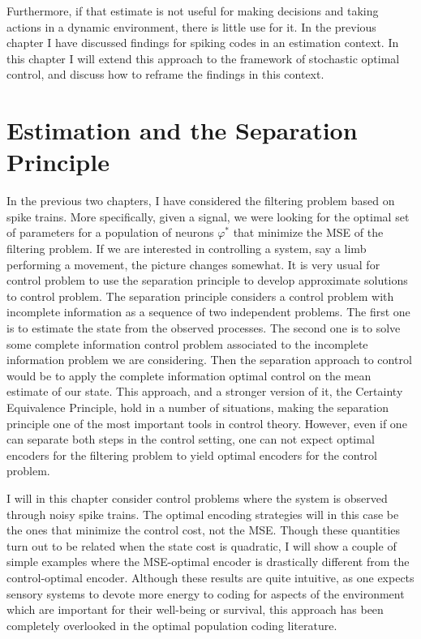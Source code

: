  Furthermore, if that estimate is not useful for making decisions and taking actions in a dynamic environment, there is little use for it. In the previous chapter I have discussed findings for spiking codes in an estimation context. In this chapter I will extend this approach to the framework of stochastic optimal control, and discuss how to reframe the findings in this context.\par

\section{Estimation and the Separation Principle}

In the previous two chapters, I have considered the filtering problem based on spike trains. More specifically, given a signal, we were looking for the optimal set of parameters for a population of neurons $\varphi^*$ that minimize the MSE of the filtering problem. If we are interested in controlling a system, say a limb performing a movement, the picture changes somewhat. It is very usual for control problem to use the separation principle\cite{Bar-Shalom1974} to develop approximate solutions to control problem. The separation principle considers a control problem with incomplete information as a sequence of two independent problems. The first one is to estimate the state from the observed processes. The second one is to solve some complete information control problem associated to the incomplete information problem we are considering. Then the separation approach to control would be to apply the complete information optimal control on the mean estimate of our state. This approach, and a stronger version of it, the Certainty Equivalence Principle, hold in a number of situations, making the separation principle one of the most important tools in control theory. However, even if one can separate both steps in the control setting, one can not expect optimal encoders for the filtering problem to yield optimal encoders for the control problem.\par
I will in this chapter consider control problems where the system is observed through noisy spike trains. The optimal encoding strategies will in this case be the ones that minimize the control cost, not the MSE. Though these quantities turn out to be related when the state cost is quadratic, I will show a couple of simple examples where the MSE-optimal encoder is drastically different from the control-optimal encoder. Although these results are quite intuitive, as one expects sensory systems to devote more energy to coding for aspects of the environment which are important for their well-being or survival, this approach has been completely overlooked in the optimal population coding literature.

